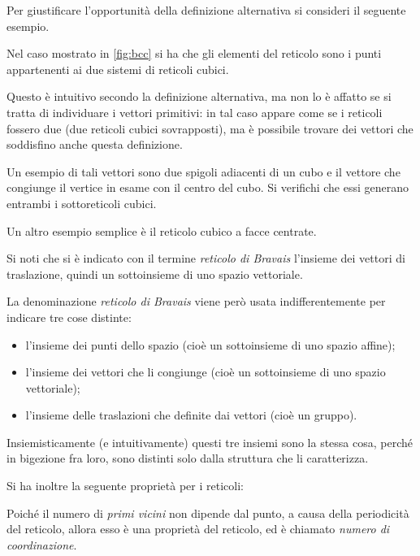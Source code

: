 Per giustificare l'opportunità della definizione alternativa si consideri il seguente esempio.

\begin{es}
	\label{es:bcc}
	Nel caso mostrato in \cref{fig:bcc} si ha che gli elementi del reticolo sono i punti appartenenti ai due sistemi di reticoli cubici.
	
	Questo è intuitivo secondo la definizione alternativa, ma non lo è affatto se si tratta di individuare i vettori primitivi: in tal caso appare come se i reticoli fossero due (due reticoli cubici sovrapposti), ma è possibile trovare dei vettori che soddisfino anche questa definizione.
	
	Un esempio di tali vettori sono due spigoli adiacenti di un cubo e il vettore che congiunge il vertice in esame con il centro del cubo. Si verifichi che essi generano entrambi i sottoreticoli cubici.
	
	
	Un altro esempio semplice è il reticolo cubico a facce centrate.
\end{es}

\begin{note}
	Si noti che si è indicato con il termine \textit{reticolo di Bravais} l'insieme dei vettori di traslazione, quindi un sottoinsieme di uno spazio vettoriale.
	
	La denominazione \textit{reticolo di Bravais} viene però usata indifferentemente per indicare tre cose distinte:
	\begin{itemize}
		\item l'insieme dei punti dello spazio (cioè un sottoinsieme di uno spazio affine);
		\item l'insieme dei vettori che li congiunge (cioè un sottoinsieme di uno spazio vettoriale);
		\item l'insieme delle traslazioni che definite dai vettori (cioè un gruppo).
	\end{itemize}
	Insiemisticamente (e intuitivamente) questi tre insiemi sono la stessa cosa, perché in bigezione fra loro, sono distinti solo dalla struttura che li caratterizza.
\end{note}

Si ha inoltre la seguente proprietà per i reticoli:

\begin{defn}
Poiché il numero di \textit{primi vicini} non dipende dal punto, a causa della periodicità del reticolo, allora esso è una proprietà del reticolo, ed è chiamato \textit{numero di coordinazione}.
\end{defn}

